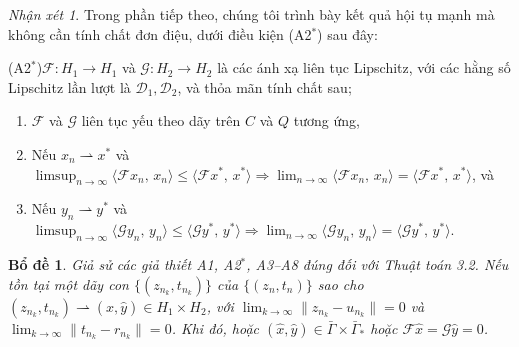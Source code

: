 \documentclass[11pt,a4paper]{article}
\theoremstyle{plain}
\newtheorem{lemma}[theorem]{Bổ đề}
\theoremstyle{definition}
\theoremstyle{remark}
\newtheorem{remark}[theorem]{Nhận xét}
\numberwithin{equation}{section}
\newcommand{\Fc}{\mathcal{F}}
\newcommand{\Gc}{\mathcal{G}}
\newcommand{\Dc}{\mathcal{D}}
\newcommand{\inp}[2]{\langle #1,\,#2\rangle}
\newcommand{\nm}[1]{\lVert #1\rVert}
\newcommand{\wto}{\rightharpoonup}
\newcommand{\Gam}{\bar{\Gamma}}
\newcommand{\Gams}{\bar{\Gamma}_{*}}
\begin{document}
\begin{remark}\label{rem:4.10}
Trong phần tiếp theo, chúng tôi trình bày kết quả hội tụ mạnh mà không cần tính chất đơn điệu, dưới điều kiện (A2$^{*}$) sau đây:
\end{remark}

\noindent(A2$^{*}$)\quad $\Fc:H_1\to H_1$ và $\Gc:H_2\to H_2$ là các ánh xạ liên tục Lipschitz, với các hằng số Lipschitz lần lượt là $\Dc_1,\Dc_2$, và thỏa mãn tính chất sau;
\begin{enumerate}[label=(\roman*)]
\item $\Fc$ và $\Gc$ liên tục yếu theo dãy trên $C$ và $Q$ tương ứng,
\item Nếu $x_n\wto x^{*}$ và $\limsup_{n\to\infty}\inp{\Fc x_n}{x_n}\le\inp{\Fc x^{*}}{x^{*}}\Longrightarrow\lim_{n\to\infty}\inp{\Fc x_n}{x_n}=\inp{\Fc x^{*}}{x^{*}}$, và
\item[(ii)] Nếu $y_n\wto y^{*}$ và $\limsup_{n\to\infty}\inp{\Gc y_n}{y_n}\le\inp{\Gc y^{*}}{y^{*}}\Longrightarrow\lim_{n\to\infty}\inp{\Gc y_n}{y_n}=\inp{\Gc y^{*}}{y^{*}}$.
\end{enumerate}

\begin{lemma}\label{lem:4.11}
Giả sử các giả thiết A1, A2$^{*}$, A3--A8 đúng đối với Thuật toán 3.2. Nếu tồn tại một dãy con $\{(z_{n_k},t_{n_k})\}$ của $\{(z_n,t_n)\}$ sao cho $(z_{n_k},t_{n_k})\wto(\hat{x},\hat{y})\in H_1\times H_2$, với $\lim_{k\to\infty}\nm{z_{n_k}-u_{n_k}}=0$ và $\lim_{k\to\infty}\nm{t_{n_k}-r_{n_k}}=0$. Khi đó, hoặc $(\hat{x},\hat{y})\in\Gam\times\Gams$ hoặc $\Fc\hat{x}=\Gc\hat{y}=0$.
\end{lemma}
\end{document}
